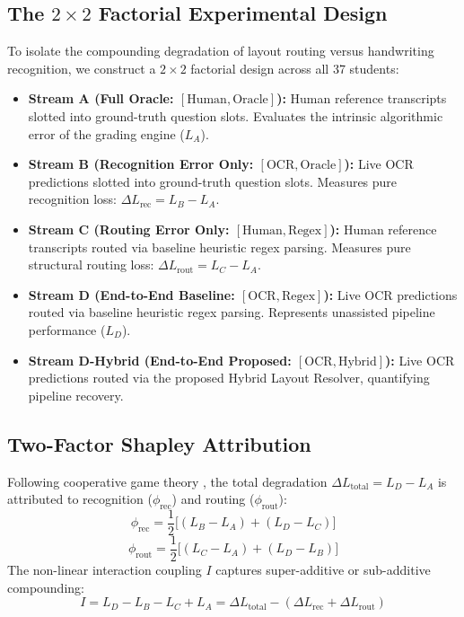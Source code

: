 \documentclass[journal]{IEEEtran}
\begin{document}
\subsection{The $2\times 2$ Factorial Experimental Design}
To isolate the compounding degradation of layout routing versus handwriting recognition, we construct a $2\times 2$ factorial design across all 37 students:
\begin{itemize}
    \item \textbf{Stream A (Full Oracle: $[\text{Human}, \text{Oracle}]$):} Human reference transcripts slotted into ground-truth question slots. Evaluates the intrinsic algorithmic error of the grading engine ($L_A$).
    \item \textbf{Stream B (Recognition Error Only: $[\text{OCR}, \text{Oracle}]$):} Live OCR predictions slotted into ground-truth question slots. Measures pure recognition loss: $\Delta L_{\text{rec}} = L_B - L_A$.
    \item \textbf{Stream C (Routing Error Only: $[\text{Human}, \text{Regex}]$):} Human reference transcripts routed via baseline heuristic regex parsing. Measures pure structural routing loss: $\Delta L_{\text{rout}} = L_C - L_A$.
    \item \textbf{Stream D (End-to-End Baseline: $[\text{OCR}, \text{Regex}]$):} Live OCR predictions routed via baseline heuristic regex parsing. Represents unassisted pipeline performance ($L_D$).
    \item \textbf{Stream D-Hybrid (End-to-End Proposed: $[\text{OCR}, \text{Hybrid}]$):} Live OCR predictions routed via the proposed Hybrid Layout Resolver, quantifying pipeline recovery.
\end{itemize}

\subsection{Two-Factor Shapley Attribution}
Following cooperative game theory \cite{lundberg2017shap}, the total degradation $\Delta L_{\text{total}} = L_D - L_A$ is attributed to recognition ($\phi_{\text{rec}}$) and routing ($\phi_{\text{rout}}$):
\begin{equation}
\phi_{\text{rec}} = \frac{1}{2} \Big[ (L_B - L_A) + (L_D - L_C) \Big]
\end{equation}
\begin{equation}
\phi_{\text{rout}} = \frac{1}{2} \Big[ (L_C - L_A) + (L_D - L_B) \Big]
\end{equation}
The non-linear interaction coupling $I$ captures super-additive or sub-additive compounding:
\begin{equation}
I = L_D - L_B - L_C + L_A = \Delta L_{\text{total}} - (\Delta L_{\text{rec}} + \Delta L_{\text{rout}})
\end{equation}
\end{document}

